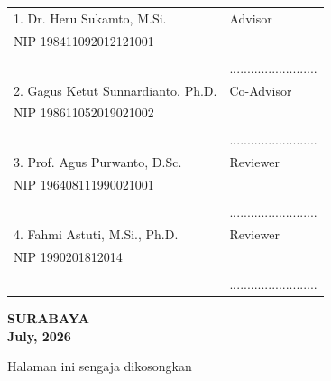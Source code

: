 \begin{center}
\noindent
\begin{tabularx}{\textwidth}{X l}
	1. Dr. Heru Sukamto, M.Si.     & Advisor \\
	NIP 198411092012121001       &  \\
	&  \\
	&.........................  \\
	2. Gagus Ketut Sunnardianto, Ph.D.   & Co-Advisor \\
	NIP 198611052019021002 	& \\
	&  \\
	& ......................... \\
	3. Prof. Agus Purwanto, D.Sc. & Reviewer \\
	NIP 196408111990021001     & \\
        &  \\
	& ......................... \\
	4. Fahmi Astuti, M.Si., Ph.D. & Reviewer \\
	NIP 1990201812014      & \\
        &  \\
	& ......................... \\
\end{tabularx}
\endgroup
  \begin{center}
	\textbf{SURABAYA\\July, 2026}
\end{center}
\end{center}

\newpage
\thispagestyle{empty}
\vspace*{\fill}
    \begin{center}
	Halaman ini sengaja dikosongkan
    \end{center}
\vspace*{\fill}
\pagebreak
